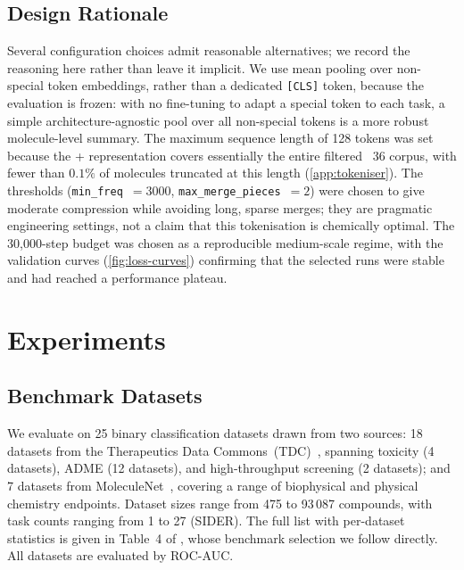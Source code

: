 \documentclass[11pt,a4paper]{article}
\begin{document}
\subsection{Design Rationale}
\label{sec:design-rationale}

Several configuration choices admit reasonable alternatives; we record the
reasoning here rather than leave it implicit. We use mean pooling over
non-special token embeddings, rather than a dedicated \texttt{[CLS]} token,
because the evaluation is frozen: with no fine-tuning to adapt a special token
to each task, a simple architecture-agnostic pool over all non-special tokens
is a more robust molecule-level summary. The maximum sequence length of 128
tokens was set because the \selfies{}+\ape{} representation covers essentially
the entire filtered \chembl{}~36 corpus, with fewer than $0.1\%$ of molecules
truncated at this length (\cref{app:tokeniser}). The \ape{} thresholds
(\texttt{min\_freq}~$=3000$, \texttt{max\_merge\_pieces}~$=2$) were chosen to
give moderate compression while avoiding long, sparse merges; they are
pragmatic engineering settings, not a claim that this tokenisation is chemically
optimal. The 30{,}000-step budget was chosen as a reproducible medium-scale
regime, with the validation curves (\cref{fig:loss-curves}) confirming that the
selected runs were stable and had reached a performance plateau.

\section{Experiments}%
\label{sec:experiments}


\subsection{Benchmark Datasets}
\label{sec:benchmarks}

We evaluate on 25 binary classification datasets drawn from two
sources: 18 datasets from the Therapeutics Data
Commons~(TDC)~\citep{huangTherapeuticsDataCommons}, spanning toxicity
(4 datasets), ADME (12 datasets), and high-throughput screening (2
datasets); and 7 datasets from
MoleculeNet~\citep{wuMoleculeNetBenchmarkMolecular2018}, covering a
range of biophysical and physical chemistry endpoints.
Dataset sizes range from 475 to 93\,087 compounds, with task counts
ranging from 1 to 27 (SIDER).
The full list with per-dataset statistics is given in Table~4 of
\citet{praskiBenchmarkingPretrainedMolecular2025}, whose benchmark
selection we follow directly.
All datasets are evaluated by ROC-AUC.
\end{document}
